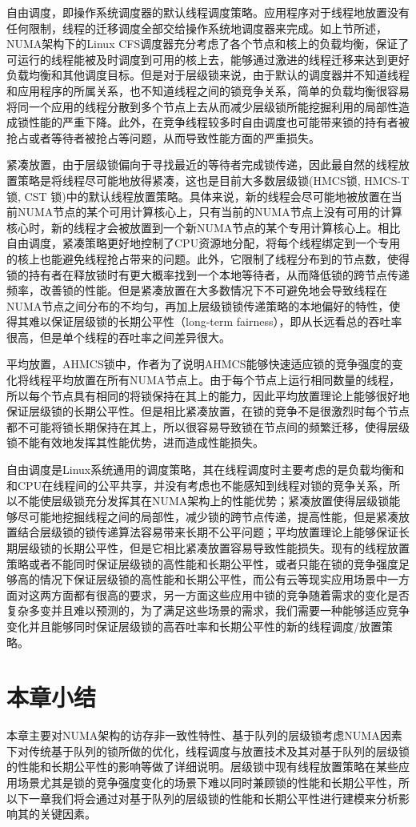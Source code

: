 自由调度，即操作系统调度器的默认线程调度策略。应用程序对于线程地放置没有任何限制，线程的迁移调度全部交给操作系统地调度器来完成。如上节所述，NUMA架构下的Linux CFS调度器充分考虑了各个节点和核上的负载均衡，保证了可运行的线程能被及时调度到可用的核上去，能够通过激进的线程迁移来达到更好负载均衡和其他调度目标\cite{guiroux2016multicore}。但是对于层级锁来说，由于默认的调度器并不知道线程和应用程序的所属关系，也不知道线程之间的锁竞争关系，简单的负载均衡很容易将同一个应用的线程分散到多个节点上去从而减少层级锁所能挖掘利用的局部性造成锁性能的严重下降。此外，在竞争线程较多时自由调度也可能带来锁的持有者被抢占或者等待者被抢占等问题，从而导致性能方面的严重损失。

紧凑放置，由于层级锁偏向于寻找最近的等待者完成锁传递，因此最自然的线程放置策略是将线程尽可能地放得紧凑，这也是目前大多数层级锁(HMCS锁\cite{chabbi2015high}, HMCS-T锁\cite{chabbi2017efficient}, CST 锁\cite{kashyap2017scalable})中的默认线程放置策略。具体来说，新的线程会尽可能地被放置在当前NUMA节点的某个可用计算核心上，只有当前的NUMA节点上没有可用的计算核心时，新的线程才会被放置到一个新NUMA节点的某个专用计算核心上。相比自由调度，紧凑策略更好地控制了CPU资源地分配，将每个线程绑定到一个专用的核上也能避免线程抢占带来的问题。此外，它限制了线程分布到的节点数，使得锁的持有者在释放锁时有更大概率找到一个本地等待者，从而降低锁的跨节点传递频率，改善锁的性能。但是紧凑放置在大多数情况下不可避免地会导致线程在NUMA节点之间分布的不均匀，再加上层级锁锁传递策略的本地偏好的特性，使得其难以保证层级锁的长期公平性（long-term fairness），即从长远看总的吞吐率很高，但是单个线程的吞吐率之间差异很大。

平均放置，AHMCS\cite{chabbi2016contention}锁中，作者为了说明AHMCS能够快速适应锁的竞争强度的变化将线程平均放置在所有NUMA节点上。由于每个节点上运行相同数量的线程，所以每个节点具有相同的将锁保持在其上的能力，因此平均放置理论上能够很好地保证层级锁的长期公平性。但是相比紧凑放置，在锁的竞争不是很激烈时每个节点都不可能将锁长期保持在其上，所以很容易导致锁在节点间的频繁迁移，使得层级锁不能有效地发挥其性能优势，进而造成性能损失。


自由调度是Linux系统通用的调度策略，其在线程调度时主要考虑的是负载均衡和和CPU在线程间的公平共享，并没有考虑也不能感知到线程对锁的竞争关系，所以不能使层级锁充分发挥其在NUMA架构上的性能优势；紧凑放置使得层级锁能够尽可能地挖掘线程之间的局部性，减少锁的跨节点传递，提高性能，但是紧凑放置结合层级锁的锁传递算法容易带来长期不公平问题；平均放置理论上能够保证长期层级锁的长期公平性，但是它相比紧凑放置容易导致性能损失。现有的线程放置策略或者不能同时保证层级锁的高性能和长期公平性，或者只能在锁的竞争强度足够高的情况下保证层级锁的高性能和长期公平性，而公有云等现实应用场景中一方面对这两方面都有很高的要求，另一方面这些应用中锁的竞争随着需求的变化是否复杂多变并且难以预测的\cite{chabbi2016contention}\cite{johnson2010decoupling}，为了满足这些场景的需求，我们需要一种能够适应竞争变化并且能够同时保证层级锁的高吞吐率和长期公平性的新的线程调度/放置策略。

\section{本章小结}
本章主要对NUMA架构的访存非一致性特性、基于队列的层级锁考虑NUMA因素下对传统基于队列的锁所做的优化，线程调度与放置技术及其对基于队列的层级锁的性能和长期公平性的影响等做了详细说明。层级锁中现有线程放置策略在某些应用场景尤其是锁的竞争强度变化的场景下难以同时兼顾锁的性能和长期公平性，所以下一章我们将会通过对基于队列的层级锁的性能和长期公平性进行建模来分析影响其的关键因素。